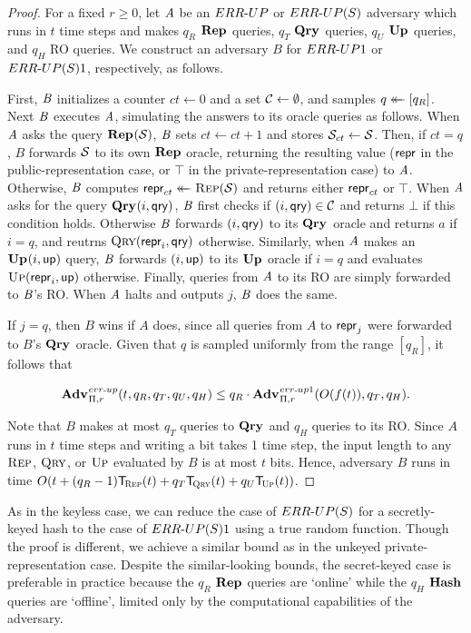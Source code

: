 \begin{proof}For a fixed $r \ge 0$, let $\mathit{A}$ be an ${ERR\mbox{-}UP}$ or ${ERR\mbox{-}UP(S)}$ adversary which runs in $t$ time steps and makes $q_R$ $\mathbf{Rep}\hspace{0.5pt}$ queries, $q_T$ $\mathbf{Qry}\hspace{0.5pt}$ queries, $q_U$ $\mathbf{Up}\hspace{0.5pt}$ queries, and $q_H$ RO queries. We construct an adversary $B$ for ${ERR\mbox{-}UP}1$ or ${ERR\mbox{-}UP(S)}1$, respectively, as follows.

First, $\mathit{B}$ initializes a counter $ct \gets 0$ and a set $\mathcal{C} \gets \emptyset$, and samples $q \mathrel{\leftarrow\mkern-14mu\leftarrow} [q_R]$. Next $\mathit{B}$ executes $\mathit{A}$, simulating the answers to its oracle queries as follows. When $\mathit{A}$ asks the query $\mathbf{Rep}\hspace{0.5pt}(\mathcal{S})$, $\mathit{B}$ sets $ct \gets ct + 1$ and stores $\mathcal{S}_{ct} \gets \mathcal{S}$. Then, if $ct = q$, $B$ forwards $\mathcal{S}$ to its own $\mathbf{Rep}\hspace{0.5pt}$ oracle, returning the resulting value ($\mathsf{repr}$ in the public-representation case, or $\top$ in the private-representation case) to $\mathit{A}$. Otherwise, $\mathit{B}$ computes $\mathsf{repr}_{ct} \mathrel{\leftarrow\mkern-14mu\leftarrow} \textsc{Rep}(\mathcal{S})$ and returns either $\mathsf{repr}_{ct}$ or $\top$. When $\mathit{A}$ asks for the query $\mathbf{Qry}\hspace{0.5pt}(i,\mathsf{qry})$, $\mathit{B}$ first checks if $(i,\mathsf{qry}) \in \mathcal{C}$ and returns $\bot$ if this condition holds. Otherwise $\mathit{B}$ forwards $(i,\mathsf{qry})$ to its $\mathbf{Qry}\hspace{0.5pt}$ oracle and returns $a$ if $i = q$, and reutrns $\textsc{Qry}(\mathsf{repr}_i,\mathsf{qry})$ otherwise. Similarly, when $\mathit{A}$ makes an $\mathbf{Up}\hspace{0.5pt}(i,\mathsf{up})$ query, $\mathit{B}$ forwards $(i,\mathsf{up})$ to its $\mathbf{Up}\hspace{0.5pt}$ oracle if $i = q$ and evaluates $\textsc{Up}(\mathsf{repr}_i,\mathsf{up})$ otherwise. Finally, queries from $\mathit{A}$ to its RO are simply forwarded to $\mathit{B}$'s RO. When $\mathit{A}$ halts and outputs $j$, $\mathit{B}$ does the same.

If $j = q$, then $B$ wins if $A$ does, since all queries from $A$ to $\mathsf{repr}_j$ were forwarded to $B$'s $\mathbf{Qry}\hspace{0.5pt}$ oracle. Given that $q$ is sampled uniformly from the range $[q_R]$, it follows that

$$\Adv{\errep}_{\struct,r}(t, q_R, q_T, q_U, q_H) \leq q_R\cdot\Adv{\errep1}_{\struct,r}(O(f(t)), q_T, q_H).$$

Note that $B$ makes at most $q_T$ queries to $\mathbf{Qry}\hspace{0.5pt}$ and $q_H$ queries to its RO. Since $A$ runs in $t$ time steps and writing a bit takes 1 time step, the input length to any $\textsc{Rep}$, $\textsc{Qry}$, or $\textsc{Up}$ evaluated by $B$ is at most $t$ bits. Hence, adversary $B$ runs in time $O(t+(q_R-1)\ticks(\Rep,t)+q_T\ticks(\Qry,t)+q_U\ticks(\Up,t))$.\missingqed
\end{proof}


As in the keyless case, we can reduce the case of ${ERR\mbox{-}UP(S)}$ for a secretly-keyed hash to the case of ${ERR\mbox{-}UP(S)}1$ using a true random function. Though the proof is different, we achieve a similar bound as in the unkeyed private-representation case. Despite the similar-looking bounds, the secret-keyed case is preferable in practice because the $q_R$ $\mathbf{Rep}\hspace{0.5pt}$ queries are `online' while the $q_H$ $\mathbf{Hash}\hspace{0.5pt}$ queries are `offline', limited only by the computational capabilities of the adversary.

